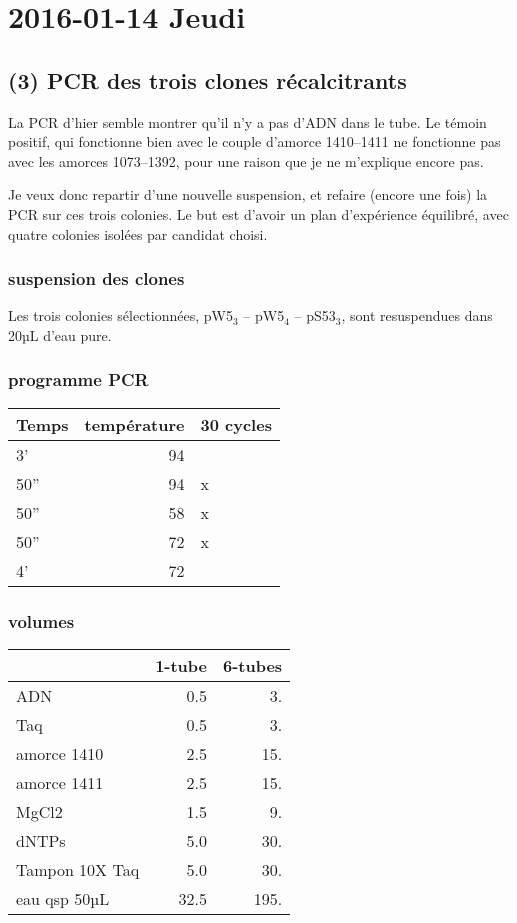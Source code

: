 \documentclass[9pt, oneside, twocolumn]{scrartcl}
\begin{document}
\section{2016-01-14 Jeudi}
\label{sec:orgheadline38}
\subsection{(3) PCR des trois clones récalcitrants}
\label{sec:orgheadline34}
La PCR d'hier semble montrer qu'il n'y a pas d'ADN dans le tube. Le témoin
positif, qui fonctionne bien avec le couple d'amorce 1410--1411 ne fonctionne
pas avec les amorces 1073--1392, pour une raison que je ne m'explique encore
pas. 

Je veux donc repartir d'une nouvelle suspension, et refaire (encore une fois) la
PCR sur ces trois colonies. Le but est d'avoir un plan d'expérience équilibré,
avec quatre colonies isolées par candidat choisi.
\subsubsection{suspension des clones}
\label{sec:orgheadline30}
Les trois colonies sélectionnées, pW5\(_{\text{3}}\) -- pW5\(_{\text{4}}\) -- pS53\(_{\text{3}}\), sont resuspendues
dans 20µL d'eau pure. 
\subsubsection{programme PCR}
\label{sec:orgheadline31}
\begin{center}
\begin{tabular}{lrl}
\toprule
Temps & température & 30 cycles\\
\midrule
3' & 94 & \\
50'' & 94 & x\\
50'' & 58 & x\\
50'' & 72 & x\\
4' & 72 & \\
\bottomrule
\end{tabular}
\end{center}

\subsubsection{volumes}
\label{sec:orgheadline32}
\begin{center}
\begin{tabular}{lrr}
\toprule
 & 1-tube & 6-tubes\\
\midrule
ADN & 0.5 & 3.\\
Taq & 0.5 & 3.\\
amorce 1410 & 2.5 & 15.\\
amorce 1411 & 2.5 & 15.\\
MgCl2 & 1.5 & 9.\\
dNTPs & 5.0 & 30.\\
Tampon 10X Taq & 5.0 & 30.\\
\midrule
eau qsp 50µL & 32.5 & 195.\\
\bottomrule
\end{tabular}
\end{center}
\end{document}
